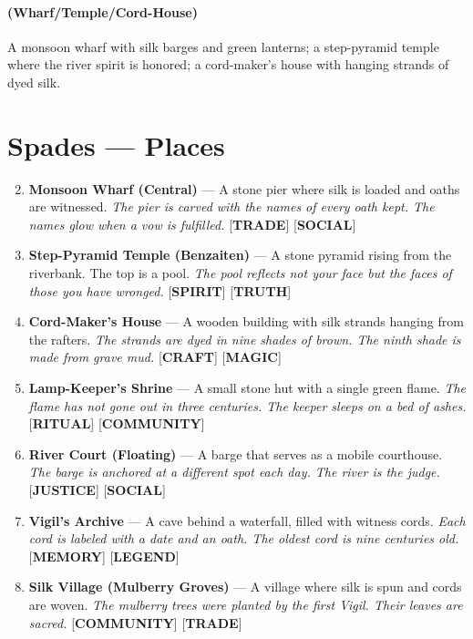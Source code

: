\paragraph*{(Wharf/Temple/Cord-House)} A monsoon wharf with silk barges and green lanterns; a step-pyramid temple where the river spirit is honored; a cord-maker's house with hanging strands of dyed silk.

\section*{Spades --- Places}
\label{sec:lethai-ar-places-revised}
\begin{enumerate}
\setcounter{enumi}{1}
\item \textbf{Monsoon Wharf (Central)} --- A stone pier where silk is loaded and oaths are witnessed.
  \hfill \textit{The pier is carved with the names of every oath kept. The names glow when a vow is fulfilled.} [\textbf{TRADE}] [\textbf{SOCIAL}]
\item \textbf{Step-Pyramid Temple (Benzaiten)} --- A stone pyramid rising from the riverbank. The top is a pool.
  \hfill \textit{The pool reflects not your face but the faces of those you have wronged.} [\textbf{SPIRIT}] [\textbf{TRUTH}]
\item \textbf{Cord-Maker's House} --- A wooden building with silk strands hanging from the rafters.
  \hfill \textit{The strands are dyed in nine shades of brown. The ninth shade is made from grave mud.} [\textbf{CRAFT}] [\textbf{MAGIC}]
\item \textbf{Lamp-Keeper's Shrine} --- A small stone hut with a single green flame.
  \hfill \textit{The flame has not gone out in three centuries. The keeper sleeps on a bed of ashes.} [\textbf{RITUAL}] [\textbf{COMMUNITY}]
\item \textbf{River Court (Floating)} --- A barge that serves as a mobile courthouse.
  \hfill \textit{The barge is anchored at a different spot each day. The river is the judge.} [\textbf{JUSTICE}] [\textbf{SOCIAL}]
\item \textbf{Vigil's Archive} --- A cave behind a waterfall, filled with witness cords.
  \hfill \textit{Each cord is labeled with a date and an oath. The oldest cord is nine centuries old.} [\textbf{MEMORY}] [\textbf{LEGEND}]
\item \textbf{Silk Village (Mulberry Groves)} --- A village where silk is spun and cords are woven.
  \hfill \textit{The mulberry trees were planted by the first Vigil. Their leaves are sacred.} [\textbf{COMMUNITY}] [\textbf{TRADE}]

\end{enumerate}
